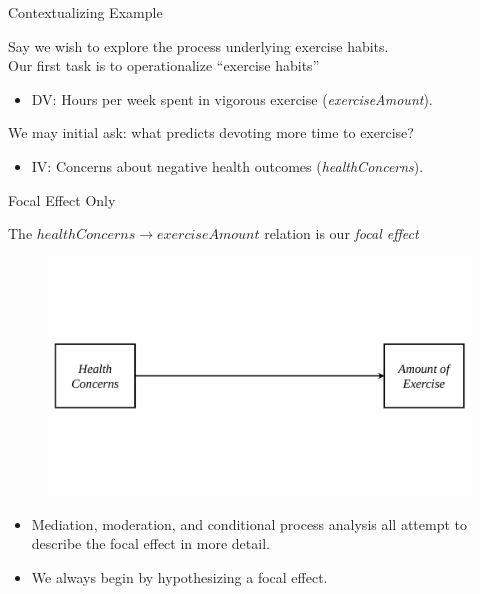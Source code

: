 \documentclass{beamer}
\newcommand{\va}[0]{\vspace{12pt}}
\newcommand{\vb}[0]{\vspace{6pt}}
\newcommand{\vx}[1]{\vspace{#1pt}}
\begin{document}
\begin{frame}{Contextualizing Example}
  
  Say we wish to explore the process underlying exercise habits.\\
  \va
  Our first task is to operationalize ``exercise habits''
  \begin{itemize}
    \item DV: Hours per week spent in vigorous exercise
      (\emph{exerciseAmount}).
  \end{itemize}
  \va 
  We may initial ask: what predicts devoting more time to
  exercise?
  \begin{itemize}
    \item IV: Concerns about negative health outcomes
      (\emph{healthConcerns}).
  \end{itemize}
 
\end{frame}


\begin{frame}{Focal Effect Only}
  
  The $healthConcerns \rightarrow exerciseAmount$ relation is our
  \emph{focal effect}
  
  \vx{-48}
  
  \begin{figure}
    \includegraphics[width=\textwidth]{figures/focalEffectDiagram.pdf}
  \end{figure}
 
  \vx{-48}
  
   \begin{itemize}
    \item Mediation, moderation, and conditional process analysis all
      attempt to describe the focal effect in more detail.
      \vb
    \item We always begin by hypothesizing a focal effect.
  \end{itemize}
 
\end{frame}
\end{document}
